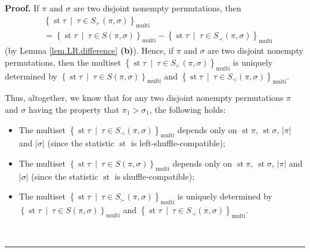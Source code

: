 \documentclass[numbers=enddot,12pt,final,onecolumn,notitlepage]{scrartcl}%
\theoremstyle{definition}
\newenvironment{proof}[1][Proof]{\noindent\textbf{#1.} }{\ \rule{0.5em}{0.5em}}
\newenvironment{verlong}{}{}
\begin{document}
\begin{verlong}
\begin{proof}
If $\pi$ and $\sigma$ are two disjoint nonempty permutations, then%
\begin{align*}
&  \left\{  \operatorname{st} \tau   \ \mid\ \tau\in S_{\succ
}\left(  \pi,\sigma\right)  \right\}  _{\operatorname*{multi}}\\
&  =\left\{  \operatorname{st} \tau   \ \mid\ \tau\in S\left(
\pi,\sigma\right)  \right\}  _{\operatorname*{multi}}-\left\{
\operatorname{st} \tau   \ \mid\ \tau\in S_{\prec}\left(
\pi,\sigma\right)  \right\}  _{\operatorname*{multi}}%
\end{align*}
(by Lemma \ref{lem.LR.difference} \textbf{(b)}). Hence, if $\pi$ and $\sigma$
are two disjoint nonempty permutations, then the multiset $\left\{
\operatorname{st} \tau   \ \mid\ \tau\in S_{\succ}\left(
\pi,\sigma\right)  \right\}  _{\operatorname*{multi}}$ is uniquely determined
by $\left\{  \operatorname{st} \tau   \ \mid\ \tau\in S\left(
\pi,\sigma\right)  \right\}  _{\operatorname*{multi}}$ and $\left\{
\operatorname{st} \tau   \ \mid\ \tau\in S_{\prec}\left(
\pi,\sigma\right)  \right\}  _{\operatorname*{multi}}$.

Thus, altogether, we know that for any two disjoint nonempty permutations
$\pi$ and $\sigma$ having the property that $\pi_{1}>\sigma_{1}$, the
following holds:

\begin{itemize}
\item The multiset $\left\{  \operatorname{st} \tau 
\ \mid\ \tau\in S_{\prec}\left(  \pi,\sigma\right)  \right\}
_{\operatorname*{multi}}$ depends only on $\operatorname{st} \pi$,
$\operatorname{st} \sigma$,
$\left\vert \pi\right\vert $ and $\left\vert \sigma\right\vert $
(since the statistic $\operatorname{st}$ is left-shuffle-compatible);

\item The multiset $\left\{  \operatorname{st} \tau 
\ \mid\ \tau\in S\left(  \pi,\sigma\right)  \right\}  _{\operatorname*{multi}%
}$ depends only on $\operatorname{st} \pi   $,
$\operatorname{st} \sigma   $, $\left\vert \pi\right\vert $ and
$\left\vert \sigma\right\vert $ (since the statistic $\operatorname{st}$ is shuffle-compatible);

\item The multiset $\left\{  \operatorname{st} \tau 
\ \mid\ \tau\in S_{\succ}\left(  \pi,\sigma\right)  \right\}
_{\operatorname*{multi}}$ is uniquely determined by \newline$\left\{
\operatorname{st} \tau   \ \mid\ \tau\in S\left(  \pi
,\sigma\right)  \right\}  _{\operatorname*{multi}}$ and $\left\{
\operatorname{st} \tau   \ \mid\ \tau\in S_{\prec}\left(
\pi,\sigma\right)  \right\}  _{\operatorname*{multi}}$.
\end{itemize}


\end{proof}
\end{verlong}
\end{document}
